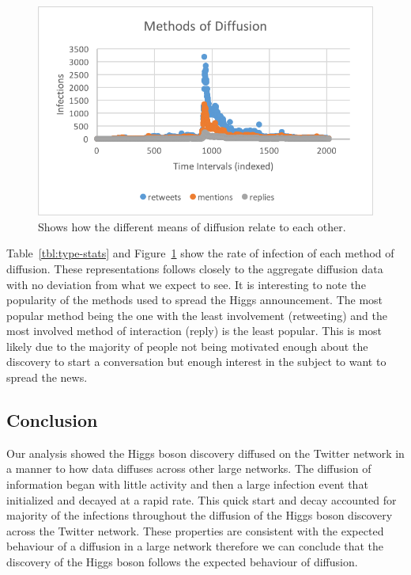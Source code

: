 \documentclass[12pt, oneside, openany]{article} %
\begin{document}
\begin{figure}
\centering
    \includegraphics{methods.png}
    \caption{Shows how the different means of diffusion relate to each other.}
    \label{fig:methods}
\end{figure}

Table~\ref{tbl:type-stats} and Figure~\ref{fig:methods} show the rate of infection of each method of diffusion. These representations follows closely to the aggregate diffusion data with no deviation from what we expect to see. It is interesting to note the popularity of the methods used to spread the Higgs announcement. The most popular method being the one with the least involvement (retweeting) and the most involved method of interaction (reply) is the least popular. This is most likely due to the majority of people not being motivated enough about the discovery to start a conversation but enough interest in the subject to want to spread the news.

\subsection{Conclusion}
Our analysis showed the Higgs boson discovery diffused on the Twitter network in a manner to how data diffuses across other large networks. The diffusion of information began with little activity and then a large infection event that initialized and decayed at a rapid rate. This quick start and decay accounted for majority of the infections throughout the diffusion of the Higgs boson discovery across the Twitter network. These properties are consistent with the expected behaviour of a diffusion in a large network therefore we can conclude that the discovery of the Higgs boson follows the expected behaviour of diffusion.
\end{document}
